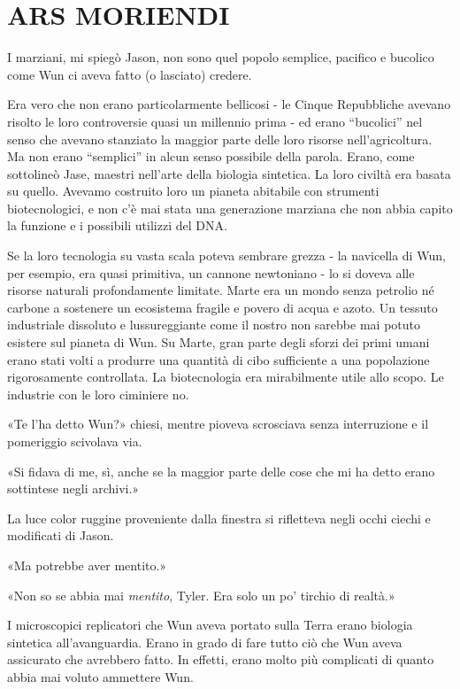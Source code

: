 \chapter{ARS MORIENDI}\label{ars-moriendi}

\hfill\break

I marziani, mi spiegò Jason, non sono quel popolo semplice, pacifico e
bucolico come Wun ci aveva fatto (o lasciato) credere.

Era vero che non erano particolarmente bellicosi - le Cinque Repubbliche
avevano risolto le loro controversie quasi un millennio prima - ed erano
``bucolici'' nel senso che avevano stanziato la maggior parte delle loro
risorse nell'agricoltura. Ma non erano ``semplici'' in alcun senso
possibile della parola. Erano, come sottolineò Jase, maestri nell'arte
della biologia sintetica. La loro civiltà era basata su quello. Avevamo
costruito loro un pianeta abitabile con strumenti biotecnologici, e non
c'è mai stata una generazione marziana che non abbia capito la funzione
e i possibili utilizzi del DNA.

Se la loro tecnologia su vasta scala poteva sembrare grezza - la
navicella di Wun, per esempio, era quasi primitiva, un cannone
newtoniano - lo si doveva alle risorse naturali profondamente limitate.
Marte era un mondo senza petrolio né carbone a sostenere un ecosistema
fragile e povero di acqua e azoto. Un tessuto industriale dissoluto e
lussureggiante come il nostro non sarebbe mai potuto esistere sul
pianeta di Wun. Su Marte, gran parte degli sforzi dei primi umani erano
stati volti a produrre una quantità di cibo sufficiente a una
popolazione rigorosamente controllata. La biotecnologia era mirabilmente
utile allo scopo. Le industrie con le loro ciminiere no.

«Te l'ha detto Wun?» chiesi, mentre pioveva scrosciava senza
interruzione e il pomeriggio scivolava via.

«Si fidava di me, sì, anche se la maggior parte delle cose che mi ha
detto erano sottintese negli archivi.»

La luce color ruggine proveniente dalla finestra si rifletteva negli
occhi ciechi e modificati di Jason.

«Ma potrebbe aver mentito.»

«Non so se abbia mai \emph{mentito}, Tyler. Era solo un po' tirchio di
realtà.»

I microscopici replicatori che Wun aveva portato sulla Terra erano
biologia sintetica all'avanguardia. Erano in grado di fare tutto ciò che
Wun aveva assicurato che avrebbero fatto. In effetti, erano molto più
complicati di quanto abbia mai voluto ammettere Wun.

